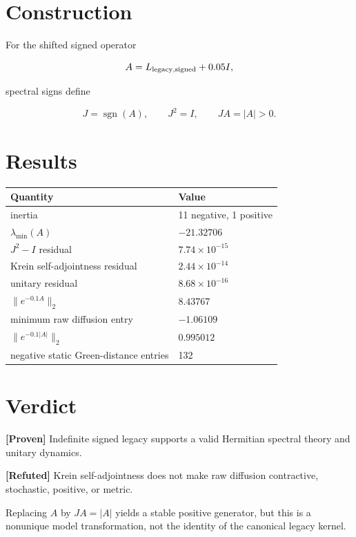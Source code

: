 \documentclass[11pt,a4paper,openany]{report}
\newcommand{\statusProven}{\textcolor{fingreen}{[Proven]}}
\newcommand{\statusRefuted}{\textcolor{finred}{[Refuted]}}
\begin{document}
\section{Construction}

For the shifted signed operator

\[
A=L_{\rm legacy,signed}+0.05I,
\]

spectral signs define

\[
J=\operatorname{sgn}(A),
\qquad
J^2=I,
\qquad
JA=|A|>0.
\]

\section{Results}

\begin{center}
\begingroup\small
\setlength{\tabcolsep}{3.5pt}
\renewcommand{\arraystretch}{1.16}
\begin{longtable}{@{}p{}p{}@{}}
\toprule
\textbf{Quantity} & \textbf{Value} \\
\midrule
\endhead
inertia & 11 negative, 1 positive \\
\(\lambda_{\min}(A)\) & \(-21.32706\) \\
\(J^2-I\) residual & \(7.74\times10^{-15}\) \\
Krein self-adjointness residual & \(2.44\times10^{-14}\) \\
unitary residual & \(8.68\times10^{-16}\) \\
\(\|e^{-0.1A}\|_2\) & \(8.43767\) \\
minimum raw diffusion entry & \(-1.06109\) \\
\(\|e^{-0.1|A|}\|_2\) & \(0.995012\) \\
negative static Green-distance entries & 132 \\
\bottomrule
\end{longtable}
\endgroup
\end{center}

\section{Verdict}

\textbf{\statusProven{}} Indefinite signed legacy supports a valid Hermitian spectral theory and unitary dynamics.

\textbf{\statusRefuted{}} Krein self-adjointness does not make raw diffusion contractive, stochastic, positive, or metric.

Replacing \(A\) by \(JA=|A|\) yields a stable positive generator, but this is a nonunique model transformation, not the identity of the canonical legacy kernel.
\end{document}
